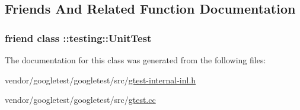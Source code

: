 \subsection{Friends And Related Function Documentation}
\subsubsection[{\texorpdfstring{\+::testing\+::\+Unit\+Test}{::testing::UnitTest}}]{\setlength{\rightskip}{0pt plus 5cm}friend class \+::{\bf testing\+::\+Unit\+Test}\hspace{0.3cm}{\ttfamily [friend]}}\hypertarget{classtesting_1_1internal_1_1UnitTestImpl_a893404438388dec058dc5c02e8f9a014}{}\label{classtesting_1_1internal_1_1UnitTestImpl_a893404438388dec058dc5c02e8f9a014}


The documentation for this class was generated from the following files\+:\begin{DoxyCompactItemize}
\item 
vendor/googletest/googletest/src/\hyperlink{gtest-internal-inl_8h}{gtest-\/internal-\/inl.\+h}\item 
vendor/googletest/googletest/src/\hyperlink{gtest_8cc}{gtest.\+cc}\end{DoxyCompactItemize}
